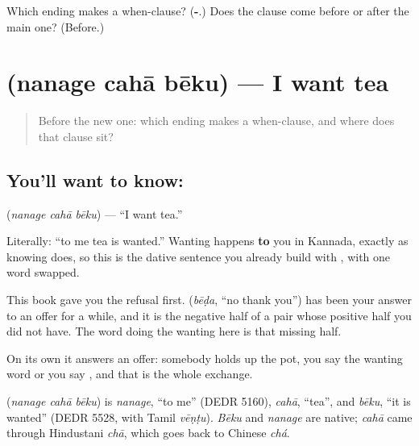 \begin{tcolorbox}[breakable,colback=teal!4,colframe=teal!35!black,title={Before you move on}]
Which ending makes a when-clause? (\textbf{-}.) Does the clause come before or after the main one? (Before.)
\end{tcolorbox}
\section[\texorpdfstring{\kn{ನನಗೆ} \kn{ಚಹಾ} \kn{ಬೇಕು} (nanage cahā bēku)}{ನನಗೆ ಚಹಾ ಬೇಕು (nanage cahā bēku)}]{   (nanage cahā bēku) — I want tea}

\label{lesson:KA-C72-want}



\begin{quote}
Before the new one: which ending makes a when-clause, and where does that clause sit?
\end{quote}

\subsection*{You'll want to know:   }
\textbf{  } (\emph{nanage cahā bēku}) — \textquotedblleft{}I want tea.\textquotedblright{}

Literally: \textquotedblleft{}to me tea is wanted.\textquotedblright{} Wanting happens \textbf{to} you in Kannada, exactly as knowing does, so this is the dative sentence you already build with , with one word swapped.

This book gave you the refusal first.  (\emph{bēḍa}, \textquotedblleft{}no thank you\textquotedblright{}) has been your answer to an offer for a while, and it is the negative half of a pair whose positive half you did not have. The word doing the wanting here is that missing half.

On its own it answers an offer: somebody holds up the pot, you say the wanting word or you say , and that is the whole exchange.

\begin{cousinweb}
\textbf{  } (\emph{nanage cahā bēku}) is \emph{nanage}, \textquotedblleft{}to me\textquotedblright{} (DEDR 5160), \emph{cahā}, \textquotedblleft{}tea\textquotedblright{}, and \emph{bēku}, \textquotedblleft{}it is wanted\textquotedblright{} (DEDR 5528, with Tamil \emph{vēṇṭu}). \emph{Bēku} and \emph{nanage} are native; \emph{cahā} came through Hindustani \emph{chā}, which goes back to Chinese \emph{chá}.
\end{cousinweb}

